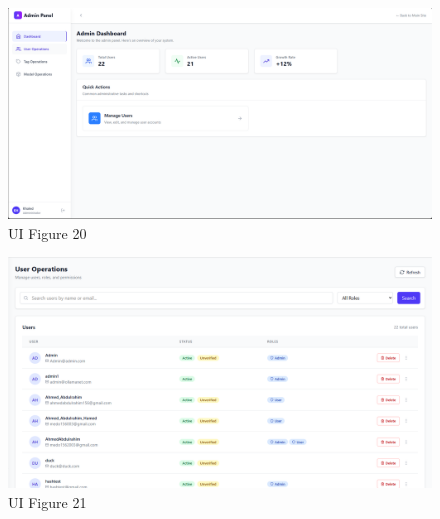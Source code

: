\begin{figure}[p]
    \centering
    \includegraphics[width=\textwidth]{./Chapter07/figures/20.png}
    \caption{UI Figure 20}
    \label{fig:ui-figure-20}
\end{figure}
\clearpage

\begin{figure}[p]
    \centering
    \includegraphics[width=\textwidth]{./Chapter07/figures/21.png}
    \caption{UI Figure 21}
    \label{fig:ui-figure-21}
\end{figure}
\clearpage